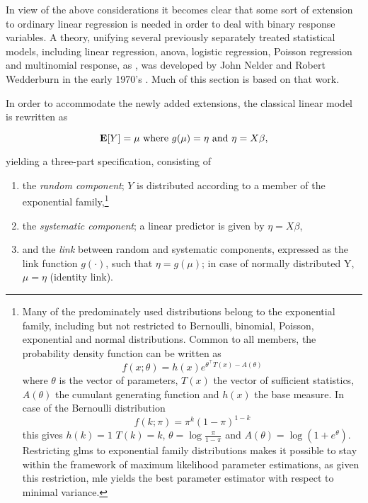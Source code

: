 In view of the above considerations it becomes clear that some sort of extension to ordinary linear regression is needed in order to deal with binary response variables. A theory, unifying several previously separately treated statistical models, including linear regression, \gls{anova}, logistic regression, Poisson regression and multinomial response, as , was developed by John Nelder and Robert Wedderburn in the early 1970's \citep{Nelder1972}. Much of this section is based on that work.

In order to accommodate the newly added extensions, the classical linear model is rewritten as

\begin{equation}
  \operatorname{\mathbf{E}}[Y] = \mu \text{ where } g(\mu) = \eta \text{ and } \eta = X \beta,
\end{equation}

yielding a three-part specification, consisting of

\begin{enumerate}[label=(\alph*)]
  \item the \textit{random component}; $Y$ is distributed according to a member of the exponential family,\footnote{Many of the predominately used distributions belong to the exponential family, including but not restricted to Bernoulli, binomial, Poisson, exponential and normal distributions. Common to all members, the probability density function can be written as
  \begin{equation}
    f(x;\theta) = h(x) e^{\theta^\intercal T(x)-A(\theta)}
  \end{equation}
  where $\theta$ is the vector of parameters, $T(x)$ the vector of sufficient statistics, $A(\theta)$ the cumulant generating function and $h(x)$ the base measure. In case of the Bernoulli distribution
  \begin{equation}
    f(k;\pi) = \pi^k (1-\pi)^{1-k}\label{eq:bern-pmf}
  \end{equation}
  this gives $h(k) = 1$ $T(k) = k$, $\theta = \log\frac{\pi}{1-\pi}$ and $A(\theta) = \log(1+e^\theta)$. Restricting \glspl{glm} to exponential family distributions makes it possible to stay within the framework of maximum likelihood parameter estimations, as given this restriction, \gls{mle} yields the best parameter estimator with respect to minimal variance.}
  \item the \textit{systematic component}; a linear predictor is given by $\eta = X\beta$,
  \item and the \textit{link} between random and systematic components, expressed as the link function $g(\cdot)$, such that $\eta = g(\mu)$; in case of normally distributed Y, $\mu = \eta$ (identity link).
\end{enumerate}

